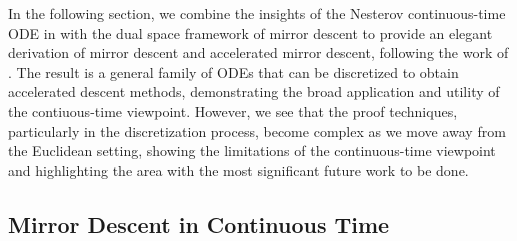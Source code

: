 In the following section, we combine the insights of the Nesterov continuous-time ODE in \cite{su2014differential} with the dual space framework of mirror descent to provide an elegant derivation of mirror descent and accelerated mirror descent, following the work of \cite{krichene2015accelerated}. The result is a general family of ODEs that can be discretized to obtain accelerated descent methods, demonstrating the broad application and utility of the contiuous-time viewpoint. However, we see that the proof techniques, particularly in the discretization process, become complex as we move away from the Euclidean setting, showing the limitations of the continuous-time viewpoint and highlighting the area with the most significant future work to be done. 

\subsection{Mirror Descent in Continuous Time}

